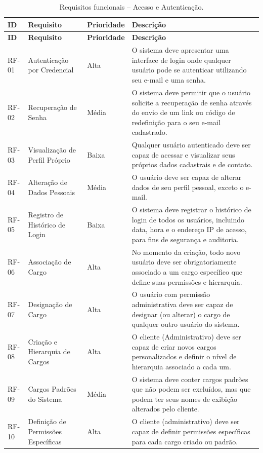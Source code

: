 \begin{xltabular}{\textwidth}{p{0.10\textwidth} p{0.20\textwidth} p{0.14\textwidth} X}
\caption{Requisitos funcionais -- Acesso e Autenticação.}\label{tab:rf-acesso}\\
\toprule
\textbf{ID} & \textbf{Requisito} & \textbf{Prioridade} & \textbf{Descrição} \\
\midrule
\endfirsthead
\toprule
\textbf{ID} & \textbf{Requisito} & \textbf{Prioridade} & \textbf{Descrição} \\
\midrule
\endhead
\bottomrule
\endlastfoot
RF-01 & Autenticação por Credencial & Alta & O sistema deve apresentar uma interface de login onde qualquer usuário pode se autenticar utilizando seu e-mail e uma senha. \\
RF-02 & Recuperação de Senha & Média & O sistema deve permitir que o usuário solicite a recuperação de senha através do envio de um link ou código de redefinição para o seu e-mail cadastrado. \\
RF-03 & Visualização de Perfil Próprio & Baixa & Qualquer usuário autenticado deve ser capaz de acessar e visualizar seus próprios dados cadastrais e de contato. \\
RF-04 & Alteração de Dados Pessoais & Média & O usuário deve ser capaz de alterar dados de seu perfil pessoal, exceto o e-mail. \\
RF-05 & Registro de Histórico de Login & Baixa & O sistema deve registrar o histórico de login de todos os usuários, incluindo data, hora e o endereço IP de acesso, para fins de segurança e auditoria. \\
RF-06 & Associação de Cargo & Alta & No momento da criação, todo novo usuário deve ser obrigatoriamente associado a um cargo específico que define suas permissões e hierarquia. \\
RF-07 & Designação de Cargo & Alta & O usuário com permissão administrativa deve ser capaz de designar (ou alterar) o cargo de qualquer outro usuário do sistema. \\
RF-08 & Criação e Hierarquia de Cargos & Alta & O cliente (Administrativo) deve ser capaz de criar novos cargos personalizados e definir o nível de hierarquia associado a cada um. \\
RF-09 & Cargos Padrões do Sistema & Média & O sistema deve conter cargos padrões que não podem ser excluídos, mas que podem ter seus nomes de exibição alterados pelo cliente. \\
RF-10 & Definição de Permissões Específicas & Alta & O cliente (administrativo) deve ser capaz de definir permissões específicas para cada cargo criado ou padrão. \\

\end{xltabular}
